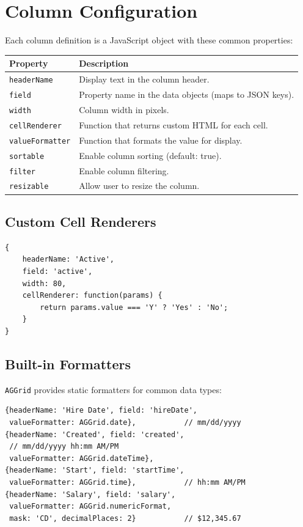 \section{Column Configuration}
\label{sec:grid-columns}

Each column definition is a JavaScript object with these common properties:

\begin{longtable}{P{3.8cm}P{6.7cm}}
\toprule
\textbf{Property} & \textbf{Description} \\
\midrule
\endhead
\texttt{headerName} & Display text in the column header. \\
\texttt{field} & Property name in the data objects (maps to JSON keys). \\
\texttt{width} & Column width in pixels. \\
\texttt{cellRenderer} & Function that returns custom HTML for each cell. \\
\texttt{valueFormatter} & Function that formats the value for display. \\
\texttt{sortable} & Enable column sorting (default: true). \\
\texttt{filter} & Enable column filtering. \\
\texttt{resizable} & Allow user to resize the column. \\
\bottomrule
\end{longtable}

\subsection{Custom Cell Renderers}

\begin{lstlisting}[style=javascript]
{
    headerName: 'Active',
    field: 'active',
    width: 80,
    cellRenderer: function(params) {
        return params.value === 'Y' ? 'Yes' : 'No';
    }
}
\end{lstlisting}

\subsection{Built-in Formatters}

\texttt{AGGrid} provides static formatters for common data types:

\begin{lstlisting}[style=javascript]
{headerName: 'Hire Date', field: 'hireDate',
 valueFormatter: AGGrid.date},           // mm/dd/yyyy
{headerName: 'Created', field: 'created',
 // mm/dd/yyyy hh:mm AM/PM
 valueFormatter: AGGrid.dateTime},
{headerName: 'Start', field: 'startTime',
 valueFormatter: AGGrid.time},           // hh:mm AM/PM
{headerName: 'Salary', field: 'salary',
 valueFormatter: AGGrid.numericFormat,
 mask: 'CD', decimalPlaces: 2}           // $12,345.67
\end{lstlisting}

